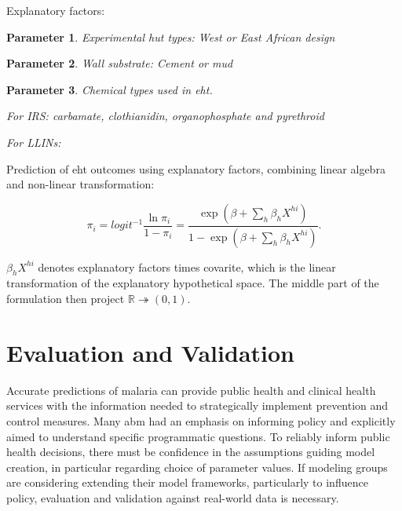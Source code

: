 \documentclass[a4paper, 12pt, twoside]{article}
\newtheorem{parameter}{Parameter}
\begin{document}
Explanatory factors:

\begin{parameter}
	\label{eht:experimental_hut_types}
	Experimental hut types: West or East African design

\end{parameter}

\begin{parameter}
	\label{eht:wall_substrate} Wall substrate: Cement or mud

\end{parameter}

\begin{parameter}
	\label{eht:chemical_class_used}
	Chemical types used in \gls{eht}.

	For IRS: carbamate, clothianidin, organophosphate and pyrethroid

	For LLINs:

\end{parameter}

Prediction of \gls{eht} outcomes using explanatory factors, combining linear algebra and non-linear transformation\cite{Sherrard-Smith2018b}:

\[
	\pi_i = logit^{-1} \frac{\ln \pi_i}{1-\pi_i} = \frac{ \exp( \beta + \sum_h \beta_h X^{hi} ) }{ 1 - \exp( \beta + \sum_h \beta_h X^{hi} ) }
	.\]

$\beta_h X^{hi}$ denotes explanatory factors times covarite, which is the linear transformation of the explanatory hypothetical space. The middle part of the formulation then project $\mathbb{R} \twoheadrightarrow (0,1)$.

\section{Evaluation and Validation}
Accurate predictions of malaria can provide public health and clinical health services with the information needed to strategically implement prevention and control measures.
Many \gls{abm} had an emphasis on informing policy and explicitly aimed to understand specific programmatic questions.
To reliably inform public health decisions, there must be confidence in the assumptions guiding model creation, in particular regarding choice of parameter values.
If modeling groups are considering extending their model frameworks, particularly to influence policy, evaluation and validation against real-world data is necessary.
\end{document}
